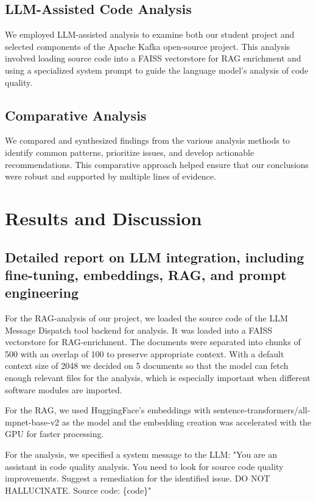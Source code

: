 \documentclass[sigconf]{acmart}
\begin{document}
\subsection{LLM-Assisted Code Analysis}
We employed LLM-assisted analysis to examine both our student project and selected components of the Apache Kafka open-source project. This analysis involved loading source code into a FAISS vectorstore for RAG enrichment and using a specialized system prompt to guide the language model's analysis of code quality.

\subsection{Comparative Analysis}
We compared and synthesized findings from the various analysis methods to identify common patterns, prioritize issues, and develop actionable recommendations. This comparative approach helped ensure that our conclusions were robust and supported by multiple lines of evidence.

\section{Results and Discussion}

\subsection{Detailed report on LLM integration, including fine-tuning, embeddings, RAG, and prompt engineering}
For the RAG-analysis of our project, we loaded the source code of the LLM Message Dispatch tool backend for analysis. It was loaded into a FAISS vectorstore for RAG-enrichment. The documents were separated into chunks of 500 with an overlap of 100 to preserve appropriate context. With a default context size of 2048 we decided on 5 documents so that the model can fetch enough relevant files for the analysis, which is especially important when different software modules are imported.

For the RAG, we used HuggingFace's embeddings with sentence-transformers/all-mpnet-base-v2 as the model and the embedding creation was accelerated with the GPU for faster processing.

For the analysis, we specified a system message to the LLM:
"You are an assistant in code quality analysis.
You need to look for source code quality improvements.
Suggest a remediation for the identified issue.
DO NOT HALLUCINATE.
Source code:
\{code\}"
\end{document}
